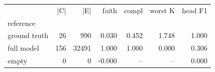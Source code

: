 \begin{tabular}{lrrrrrr}
\toprule
 & |C| & |E| & faith & compl & worst K & head F1 \\
reference &  &  &  &  &  &  \\
\midrule
ground truth & 26 & 990 & 0.030 & 0.452 & 1.748 & 1.000 \\
full model & 156 & 32491 & 1.000 & 1.000 & 0.000 & 0.306 \\
empty & 0 & 0 & -0.000 & -- & -- & 0.000 \\
\bottomrule
\end{tabular}
